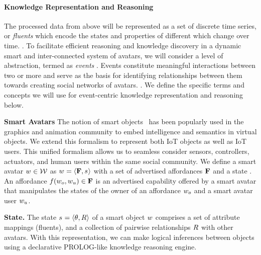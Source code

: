 

\paragraph{Knowledge Representation and Reasoning} 

The processed data from above will be represented as a set of discrete time series, or \emph{fluents} which encode the states and properties of different \avatar which change over time. . To facilitate efficient reasoning and knowledge discovery in a dynamic smart and inter-connected system of avatars, we will consider a level of abstraction, termed as \emph{events }. Events constitute meaningful interactions between two or more \avatar and serve as the basis for identifying relationships between them towards creating social networks of avatars. . We define the specific terms and concepts we will use for event-centric knowledge representation and reasoning below. 

\noindent \textbf{Smart Avatars} The notion of smart objects~\cite{Kallmann:1999:DIS:323663.323683} has been popularly used in the graphics and animation community to embed intelligence and semantics in virtual objects. We extend this formalism to represent both IoT objects as well as IoT users. This unified formalism allows us to seamless consider sensors, controllers, actuators, and human users within the same social community.  We define a smart avatar $w_{} \in \mathcal{W}$ as $w_{} = \langle \mathbf{F}, s_{} \rangle$ with a set of advertised affordances $\mathbf{F}$ and a state \state{}. An affordance $f(w_o, w_u) \in \mathbf{F}$ is an advertised capability offered by a smart avatar that manipulates the states of the owner of an affordance $w_o$ and a smart avatar user $w_u$. 

\noindent \textbf{State.} The state $s_{} = \langle \theta, R \rangle$ of a smart object $w_{}$ comprises a set of attribute mappings \attributeSymbol (fluents), and a collection of pairwise relationships $R$ with other avatars. With this representation, we can make logical inferences between objects using a declarative PROLOG-like knowledge reasoning engine. 





